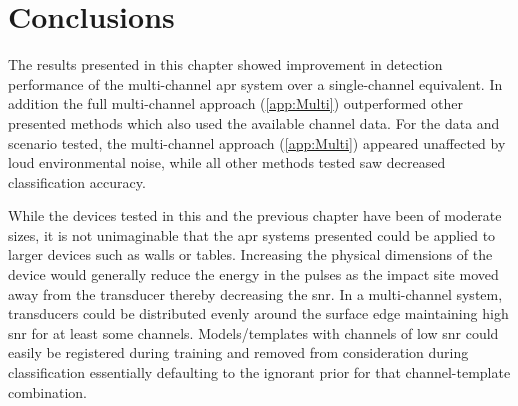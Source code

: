 \DIFaddbegin {}

\DIFaddend %


\section{Conclusions}
The results presented in this chapter showed \DIFdelbegin {}\DIFdelend \DIFaddbegin {}\DIFaddend improvement in detection performance of the multi-channel \DIFdelbegin {}\DIFdelend \DIFaddbegin \gls{apr} \DIFaddend system over a single-channel equivalent. In addition the full multi-channel approach (\ref{app:Multi}) outperformed other presented methods which also used the available channel data. For the data and scenario tested, the multi-channel approach (\ref{app:Multi}) appeared unaffected by loud environmental noise, while all other methods tested saw decreased classification accuracy.

While the devices tested in this and the previous chapter have been of moderate sizes, it is not unimaginable that the \DIFdelbegin {}\DIFdelend \DIFaddbegin \gls{apr} \DIFaddend systems presented could be applied to larger devices such as walls or tables. Increasing the physical dimensions of the device would generally reduce the energy in the pulses as the impact site moved away from the transducer thereby decreasing the \DIFdelbegin {}\DIFdelend \DIFaddbegin \gls{snr}\DIFaddend . In a multi-channel system, transducers could be distributed evenly around the surface edge maintaining high \DIFdelbegin {}\DIFdelend \DIFaddbegin \gls{snr} \DIFaddend for at least some channels. Models/templates with channels of low \DIFdelbegin {}\DIFdelend \DIFaddbegin \gls{snr} \DIFaddend could easily be registered during training and removed from consideration during classification essentially defaulting to the ignorant prior for that channel-template combination.

